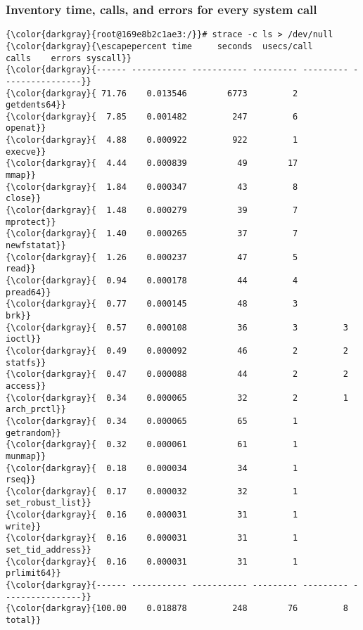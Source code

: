 {{		\subsubsection{Inventory time, calls, and errors for every system call}
{\footnotesize{
\begin{Verbatim}[commandchars=\\\{\}]
{\color{darkgray}{root@169e8b2c1ae3:/}}# strace -c ls > /dev/null
{\color{darkgray}{\escapepercent time     seconds  usecs/call     calls    errors syscall}}
{\color{darkgray}{------ ----------- ----------- --------- --------- ----------------}}
{\color{darkgray}{ 71.76    0.013546        6773         2           getdents64}}
{\color{darkgray}{  7.85    0.001482         247         6           openat}}
{\color{darkgray}{  4.88    0.000922         922         1           execve}}
{\color{darkgray}{  4.44    0.000839          49        17           mmap}}
{\color{darkgray}{  1.84    0.000347          43         8           close}}
{\color{darkgray}{  1.48    0.000279          39         7           mprotect}}
{\color{darkgray}{  1.40    0.000265          37         7           newfstatat}}
{\color{darkgray}{  1.26    0.000237          47         5           read}}
{\color{darkgray}{  0.94    0.000178          44         4           pread64}}
{\color{darkgray}{  0.77    0.000145          48         3           brk}}
{\color{darkgray}{  0.57    0.000108          36         3         3 ioctl}}
{\color{darkgray}{  0.49    0.000092          46         2         2 statfs}}
{\color{darkgray}{  0.47    0.000088          44         2         2 access}}
{\color{darkgray}{  0.34    0.000065          32         2         1 arch_prctl}}
{\color{darkgray}{  0.34    0.000065          65         1           getrandom}}
{\color{darkgray}{  0.32    0.000061          61         1           munmap}}
{\color{darkgray}{  0.18    0.000034          34         1           rseq}}
{\color{darkgray}{  0.17    0.000032          32         1           set_robust_list}}
{\color{darkgray}{  0.16    0.000031          31         1           write}}
{\color{darkgray}{  0.16    0.000031          31         1           set_tid_address}}
{\color{darkgray}{  0.16    0.000031          31         1           prlimit64}}
{\color{darkgray}{------ ----------- ----------- --------- --------- ----------------}}
{\color{darkgray}{100.00    0.018878         248        76         8 total}}
\end{Verbatim}
}}

}}
